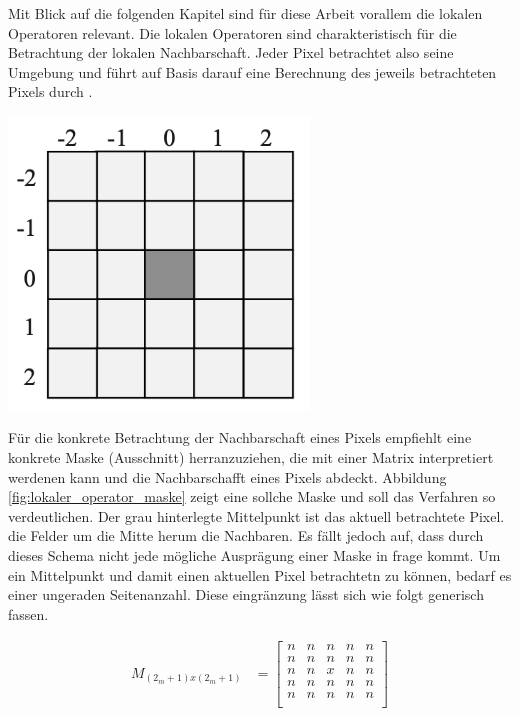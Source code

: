 \begin{minipage}{0.40\textwidth}
	Mit Blick auf die folgenden Kapitel sind für diese Arbeit vorallem die lokalen
	Operatoren relevant. Die lokalen Operatoren sind charakteristisch für die
	Betrachtung der lokalen Nachbarschaft. Jeder Pixel betrachtet also seine Umgebung
	und führt auf Basis darauf eine Berechnung des jeweils betrachteten Pixels durch
	\citep[vgl.][Seite 52]{handels2000}.
\end{minipage}
\hfill
\begin{minipage}{0.50\textwidth}
	\centering
	\includegraphics[width=0.60\textwidth]{img/lokaler_operator_maske.jpg}
	\label{fig:lokaler_operator_maske}
\end{minipage}

Für die konkrete Betrachtung der Nachbarschaft eines Pixels empfiehlt \citet[Seite
52]{handels2000} eine konkrete Maske (Ausschnitt) herranzuziehen, die mit einer
Matrix interpretiert werdenen kann und die Nachbarschafft eines Pixels abdeckt. Abbildung
\ref{fig:lokaler_operator_maske} zeigt eine sollche Maske und soll das Verfahren
so verdeutlichen. Der grau hinterlegte Mittelpunkt ist das aktuell betrachtete
Pixel. die Felder um die Mitte herum die Nachbaren. Es fällt jedoch auf, dass durch
dieses Schema nicht jede mögliche Ausprägung einer Maske in frage kommt. Um ein
Mittelpunkt und damit einen aktuellen Pixel betrachtetn zu können, bedarf es einer
ungeraden Seitenanzahl. Diese eingränzung lässt sich wie folgt generisch fassen.

\begin{align}
	\label{equ:lokaler_operator}M_{(2_m+1)x(2_m+1)} & = \begin{bmatrix}n & n & n & n & n\\ n & n & n & n & n\\ n & n & x & n & n\\ n & n & n & n & n\\ n & n & n & n & n\\\end{bmatrix}
\end{align}

